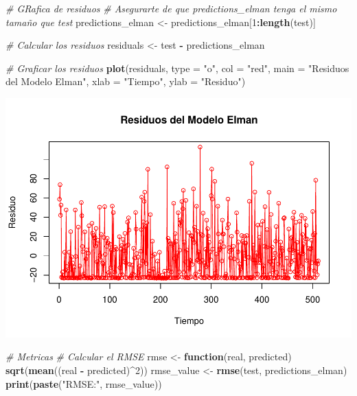 \documentclass[
]{book}
\newenvironment{Shaded}{\begin{snugshade}}{\end{snugshade}}
\newcommand{\AttributeTok}[1]{\textcolor[rgb]{0.13,0.29,0.53}{#1}}
\newcommand{\CommentTok}[1]{\textcolor[rgb]{0.56,0.35,0.01}{\textit{#1}}}
\newcommand{\ControlFlowTok}[1]{\textcolor[rgb]{0.13,0.29,0.53}{\textbf{#1}}}
\newcommand{\DecValTok}[1]{\textcolor[rgb]{0.00,0.00,0.81}{#1}}
\newcommand{\FunctionTok}[1]{\textcolor[rgb]{0.13,0.29,0.53}{\textbf{#1}}}
\newcommand{\NormalTok}[1]{#1}
\newcommand{\OtherTok}[1]{\textcolor[rgb]{0.56,0.35,0.01}{#1}}
\newcommand{\SpecialCharTok}[1]{\textcolor[rgb]{0.81,0.36,0.00}{\textbf{#1}}}
\newcommand{\StringTok}[1]{\textcolor[rgb]{0.31,0.60,0.02}{#1}}
\begin{document}
\begin{Shaded}
\begin{Highlighting}[]
\CommentTok{\# GRafica de residuos}
\CommentTok{\# Asegurarte de que \textquotesingle{}predictions\_elman\textquotesingle{} tenga el mismo tamaño que \textquotesingle{}test\textquotesingle{}}
\NormalTok{predictions\_elman }\OtherTok{\textless{}{-}}\NormalTok{ predictions\_elman[}\DecValTok{1}\SpecialCharTok{:}\FunctionTok{length}\NormalTok{(test)]}

\CommentTok{\# Calcular los residuos}
\NormalTok{residuals }\OtherTok{\textless{}{-}}\NormalTok{ test }\SpecialCharTok{{-}}\NormalTok{ predictions\_elman}

\CommentTok{\# Graficar los residuos}
\FunctionTok{plot}\NormalTok{(residuals, }\AttributeTok{type =} \StringTok{"o"}\NormalTok{, }\AttributeTok{col =} \StringTok{"red"}\NormalTok{, }\AttributeTok{main =} \StringTok{"Residuos del Modelo Elman"}\NormalTok{, }\AttributeTok{xlab =} \StringTok{"Tiempo"}\NormalTok{, }\AttributeTok{ylab =} \StringTok{"Residuo"}\NormalTok{)}
\end{Highlighting}
\end{Shaded}

\includegraphics{_main_files/figure-latex/unnamed-chunk-40-2.pdf}

\begin{Shaded}
\begin{Highlighting}[]
\CommentTok{\# Metricas}
\CommentTok{\# Calcular el RMSE}
\NormalTok{rmse }\OtherTok{\textless{}{-}} \ControlFlowTok{function}\NormalTok{(real, predicted) }\FunctionTok{sqrt}\NormalTok{(}\FunctionTok{mean}\NormalTok{((real }\SpecialCharTok{{-}}\NormalTok{ predicted)}\SpecialCharTok{\^{}}\DecValTok{2}\NormalTok{))}
\NormalTok{rmse\_value }\OtherTok{\textless{}{-}} \FunctionTok{rmse}\NormalTok{(test, predictions\_elman)}
\FunctionTok{print}\NormalTok{(}\FunctionTok{paste}\NormalTok{(}\StringTok{"RMSE:"}\NormalTok{, rmse\_value))}
\end{Highlighting}
\end{Shaded}
\end{document}
